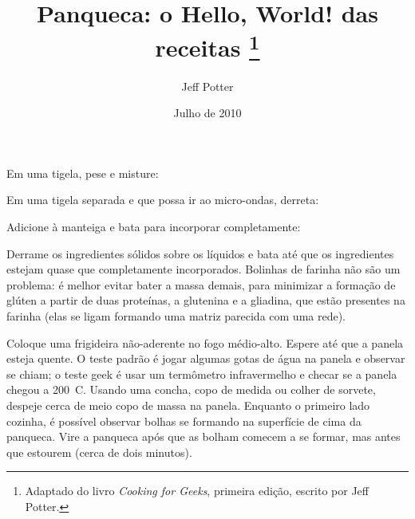 \documentclass[a4paper,oneside]{article}
\title{Panqueca: o Hello, World! das receitas%
  \footnote{Adaptado do livro \emph{Cooking for Geeks}, primeira edição,
  escrito por Jeff Potter.}}
\author{Jeff Potter}
\date{Julho de 2010}
\begin{document}
\frenchspacing

\maketitle

Em uma tigela, pese e misture:


Em uma tigela separada e que possa ir ao micro-ondas, derreta:


Adicione à manteiga e bata para incorporar completamente:


Derrame os ingredientes sólidos sobre os líquidos e bata até que os
ingredientes estejam quase que completamente incorporados. Bolinhas de farinha
não são um problema: é melhor evitar bater a massa demais, para minimizar a
formação de glúten a partir de duas proteínas, a glutenina e a gliadina, que
estão presentes na farinha (elas se ligam formando uma matriz parecida com uma
rede).

Coloque uma frigideira não-aderente no fogo médio-alto. Espere até que a panela
esteja quente. O teste padrão é jogar algumas gotas de água na panela e
observar se chiam; o teste geek é usar um termômetro infravermelho e checar se
a panela chegou a 200~\textdegree C. Usando uma concha, copo de medida ou
colher de sorvete, despeje cerca de meio copo de massa na panela. Enquanto o
primeiro lado cozinha, é possível observar bolhas se formando na superfície de
cima da panqueca. Vire a panqueca após que as bolham comecem a se formar, mas
antes que estourem (cerca de dois minutos).
\end{document}
